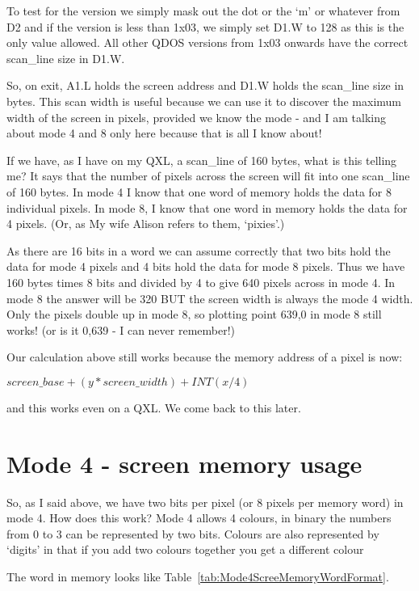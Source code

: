 To test for the version we simply mask out the dot or the `m' or
    whatever from D2 and if the version is less than 1x03, we simply set D1.W
    to 128 as this is the only value allowed. All other QDOS versions from
    1x03 onwards have the correct scan\_line size in D1.W.

So, on exit, A1.L holds the screen address and D1.W holds the
    scan\_line size in bytes. This scan width is useful because we can use it
    to discover the maximum width of the screen in pixels, provided we know
    the mode -{} and I am talking about mode 4 and 8 only here because that is
    all I know about!

If we have, as I have on my QXL, a scan\_line of 160 bytes, what is
    this telling me? It says that the number of pixels across the screen will
    fit into one scan\_line of 160 bytes. In mode 4 I know that one word of
    memory holds the data for 8 individual pixels. In mode 8, I know that one
    word in memory holds the data for 4 pixels. (Or, as My wife Alison refers
    to them, `pixies'.)

As there are 16 bits in a word we can assume correctly that two bits
    hold the data for mode 4 pixels and 4 bits hold the data for mode 8
    pixels. Thus we have 160 bytes times 8 bits and divided by 4 to give 640
    pixels across in mode 4. In mode 8 the answer will be 320 BUT the screen
    width is always the mode 4 width. Only the pixels double up in mode 8, so
    plotting point 639,0 in mode 8 still works! (or is it 0,639 -{} I can never
    remember!)

Our calculation above still works because the memory address of a
    pixel is now:

$screen\_base + (y * screen\_width) + INT(x / 4)$

and this works even on a QXL. We come back to this later.

\section{Mode 4 -{} screen memory usage}
\label{ch8-mode-4}%

So, as I said above, we have two bits per pixel (or 8 pixels per
    memory word) in mode 4. How does this work? Mode 4 allows 4 colours, in
    binary the numbers from 0 to 3 can be represented by two bits. Colours are
    also represented by `digits' in that if you add two colours together you
    get a different colour

The word in memory looks like Table~\ref{tab:Mode4ScreeMemoryWordFormat}.

